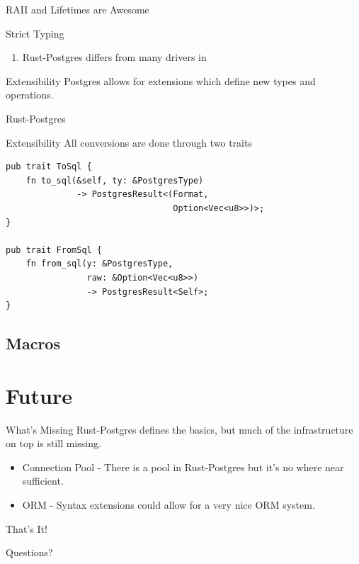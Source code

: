 \documentclass{beamer}
\begin{document}
\begin{frame}{RAII and Lifetimes are Awesome}
\end{frame}

\begin{frame}{Strict Typing}
    \begin{enumerate}
        \item Rust-Postgres differs from many drivers in 
    \end{enumerate}
\end{frame}

\begin{frame}{Extensibility}
    Postgres allows for extensions which define new types and operations.

    Rust-Postgres
\end{frame}

\begin{frame}[fragile]{Extensibility}
    All conversions are done through two traits
    \begin{verbatim}
pub trait ToSql {
    fn to_sql(&self, ty: &PostgresType)
              -> PostgresResult<(Format,
                                 Option<Vec<u8>>)>;
} 

pub trait FromSql {
    fn from_sql(y: &PostgresType,
                raw: &Option<Vec<u8>>)
                -> PostgresResult<Self>;
}
    \end{verbatim}
\end{frame}

\subsection{Macros}

\section{Future}

\begin{frame}{What's Missing}
    Rust-Postgres defines the basics, but much of the infrastructure on top
    is still missing.
    \begin{itemize}
        \item Connection Pool - There is a pool in Rust-Postgres but it's no
        where near sufficient.
        \item ORM - Syntax extensions could allow for a very nice ORM system.
    \end{itemize}
\end{frame}

\begin{frame}{That's It!}
    \begin{center}
        Questions?
    \end{center}
\end{frame}
\end{document}
